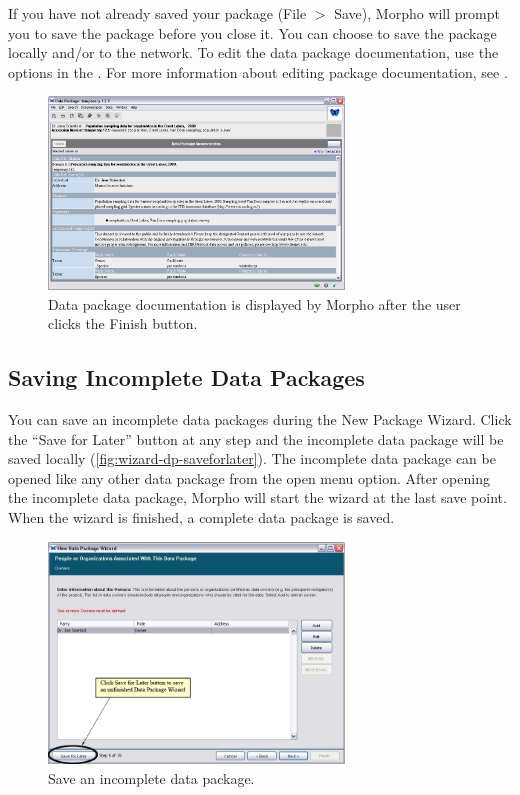If you have not already saved your package (File $>$ Save), Morpho will
prompt you to save the package before you close it. You can choose to
save the package locally and/or to the network. To edit the data package
documentation, use the options in the .
For more information about editing package documentation, see
.

\begin{figure}
  \centering
    \includegraphics[width=0.7\textwidth]{images/viewer-metadata.png}
  \caption{Data package documentation is displayed by Morpho after the
    user clicks the Finish button.}
  \label{fig:viewer-metadata}
\end{figure}

\subsection{Saving Incomplete Data Packages} \label{sec:dp-saveforlater}

You can save an incomplete data packages during the New Package Wizard.
Click the ``Save for Later'' button at any step and the incomplete data
package will be saved locally (\autoref{fig:wizard-dp-saveforlater}).
The incomplete data package can be opened like any other data package
from the open menu option. After opening the incomplete data package,
Morpho will start the wizard at the last save point. When the wizard is
finished, a complete data package is saved.

\begin{figure}
  \centering
    \includegraphics[width=0.7\textwidth]{images/wizard-dp-saveforlater.jpg}
  \caption{Save an incomplete data package.}
  \label{fig:wizard-dp-saveforlater}
\end{figure}

